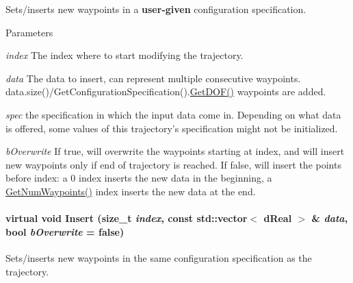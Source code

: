 Sets/inserts new waypoints in a {\bfseries user-\/given} configuration specification. 


\begin{DoxyParams}{Parameters}
\item[{\em index}]The index where to start modifying the trajectory. \item[{\em data}]The data to insert, can represent multiple consecutive waypoints. data.size()/GetConfigurationSpecification().\hyperlink{classOpenRAVE_1_1TrajectoryBase_a181d63496678472a4e902bcea6fea659}{GetDOF()} waypoints are added. \item[{\em spec}]the specification in which the input data come in. Depending on what data is offered, some values of this trajectory's specification might not be initialized. \item[{\em bOverwrite}]If true, will overwrite the waypoints starting at index, and will insert new waypoints only if end of trajectory is reached. If false, will insert the points before index: a 0 index inserts the new data in the beginning, a \hyperlink{classOpenRAVE_1_1TrajectoryBase_aee0058cd9ab78480cbef78db3bf1fc75}{GetNumWaypoints()} index inserts the new data at the end. \end{DoxyParams}
\hypertarget{classOpenRAVE_1_1TrajectoryBase_a2d4b62249bd00ee23a28a491fce41dc1}{
\paragraph[{Insert}]{\setlength{\rightskip}{0pt plus 5cm}virtual void Insert (size\_\-t {\em index}, \/  const std::vector$<$ dReal $>$ \& {\em data}, \/  bool {\em bOverwrite} = {\ttfamily false})}\hfill}
\label{classOpenRAVE_1_1TrajectoryBase_a2d4b62249bd00ee23a28a491fce41dc1}


Sets/inserts new waypoints in the same configuration specification as the trajectory. 


